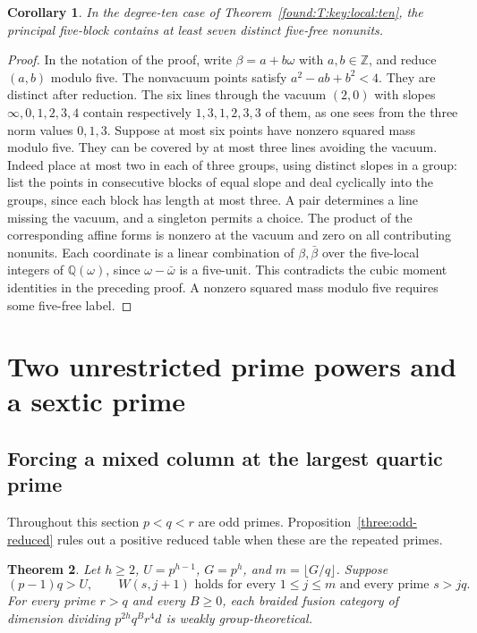 \documentclass[11pt,a4paper]{article}
\numberwithin{equation}{section}
\newtheorem{theorem}{Theorem}[section]
\newtheorem{corollary}[theorem]{Corollary}
\theoremstyle{remark}
\newcommand{\ZZ}{\mathbb Z}
\newcommand{\QQ}{\mathbb Q}
\begin{document}
\begin{corollary}\label{found:T:3.3}
In the degree-ten case of Theorem~\ref{found:T:key:local:ten}, the principal
five-block contains at least seven distinct five-free
nonunits.
\end{corollary}
\begin{proof}
In the notation of the proof, write $\beta=a+b\omega$ with
$a,b\in\ZZ$, and reduce $(a,b)$ modulo five. The nonvacuum points
satisfy $a^2-ab+b^2<4$. They are distinct after reduction. The six
lines through the vacuum $(2,0)$ with slopes $\infty,0,1,2,3,4$
contain respectively $1,3,1,2,3,3$ of them, as one sees from the
three norm values $0,1,3$. Suppose at most six points have nonzero
squared mass modulo five. They can be covered by at most three lines
avoiding the vacuum. Indeed place at most two in each of three groups,
using distinct slopes in a group: list the points in consecutive
blocks of equal slope and deal cyclically into the groups, since
each block has length at most three. A pair determines a line
missing the vacuum, and a singleton permits a choice. The product of
the corresponding affine forms is nonzero at the vacuum and zero on
all contributing nonunits. Each coordinate is a linear combination
of $\beta,\bar\beta$ over the five-local integers of $\QQ(\omega)$,
since $\omega-\bar\omega$ is a five-unit.
This contradicts the cubic moment identities in the preceding proof.
A nonzero squared mass modulo five requires some five-free label.
\end{proof}

\section{Two unrestricted prime powers and a sextic prime}\label{found:group:uniform}

\subsection{Forcing a mixed column at the largest quartic prime}\label{found:S:2}
\label{found:S:key:sec:topheight}

Throughout this section $p<q<r$ are odd primes. Proposition~\ref{three:odd-reduced} rules out a positive reduced table when these are the repeated primes.

\begin{theorem}\label{found:S:2.1}\label{found:S:key:thm:topheight}
Let $h\ge2$, $U=p^{h-1}$, $G=p^h$, and $m=\lfloor G/q\rfloor$.
Suppose
\[
(p-1)q>U,\qquad
W(s,j+1)\text{ holds for every }1\le j\le m
\text{ and every prime }s>jq.
\]
For every prime $r>q$ and every $B\ge0$, each braided fusion category
of dimension dividing $p^{2h}q^B r^4d$ is weakly group-theoretical.
\end{theorem}
\end{document}
